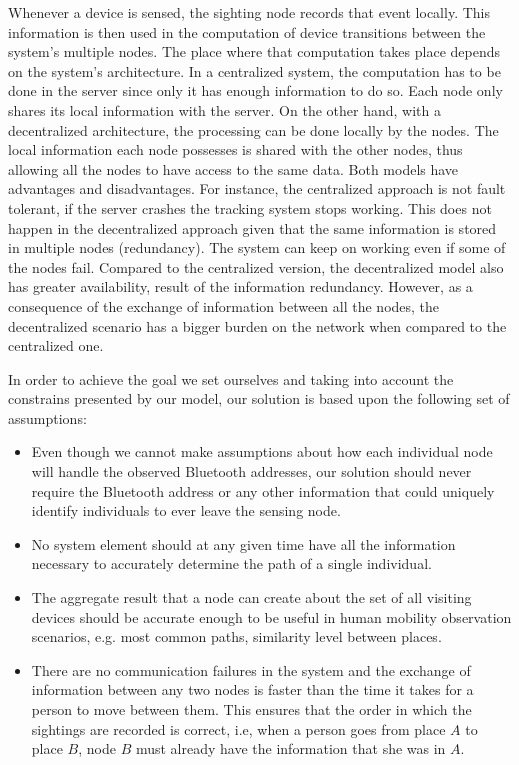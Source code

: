 Whenever a device is sensed, the sighting node records that event
locally. This information is then used in the computation of device
transitions between the system's multiple nodes. The place where that
computation takes place depends on the system's architecture. In a
centralized system, the computation has to be done in the server since
only it has enough information to do so. Each node only shares its
local information with the server. On the other hand, with a
decentralized architecture, the processing can be done locally by the
nodes. The local information each node possesses is shared with the other
nodes, thus allowing all the nodes to have access to the same
data. Both models have advantages and disadvantages. For instance, the
centralized approach is not fault tolerant, if the server crashes the
tracking system stops working. This does not happen in the
decentralized approach given that the same information is stored in
multiple nodes (redundancy). The system can keep on working even if
some of the nodes fail. Compared to the centralized version, the
decentralized model also has greater availability, result of the
information redundancy. However, as a consequence of the exchange of
information between all the nodes, the decentralized scenario has
a bigger burden on the network when compared to the centralized one. 


In order to achieve the goal we set ourselves and taking into account
the constrains presented by our model, our solution is based upon the
following set of assumptions:
\begin{itemize}
\item Even though we cannot make assumptions about how each individual
  node will handle the observed Bluetooth addresses, our solution
  should never require the Bluetooth address or any other information
  that could uniquely identify individuals to ever leave the sensing
  node.
\item No system element should at any given time have all the
  information necessary to accurately determine the path of a single
  individual.
\item The aggregate result that a node can create about the set of all
  visiting devices should be accurate enough to be useful in human
  mobility observation scenarios, e.g. most common paths, similarity
  level between places.
\item There are no communication failures in the system and the
  exchange of information between any two nodes is faster than the
  time it takes for a person to move between them. This ensures that
  the order in which the sightings are recorded is correct, i.e, when
  a person goes from place $A$ to place $B$, node $B$ must already
  have the information that she was in $A$. 
\end{itemize}

